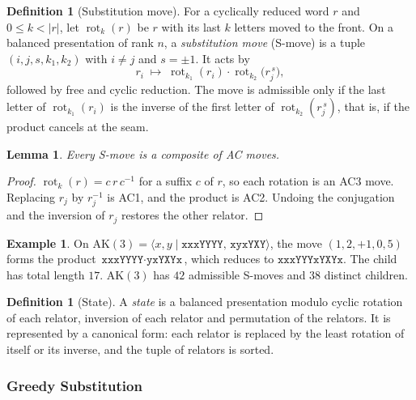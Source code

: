\documentclass[11pt]{article}
\newtheorem{lemma}[theorem]{Lemma}
\theoremstyle{definition}
\newtheorem{definition}[theorem]{Definition}
\newtheorem{example}[theorem]{Example}
\theoremstyle{remark}
\newcommand{\pres}[2]{\langle #1 \mid #2 \rangle}
\newcommand{\rot}{\operatorname{rot}}
\begin{document}
\begin{definition}[Substitution move]\label{def:smove}
For a cyclically reduced word $r$ and $0\le k<|r|$, let $\rot_k(r)$ be $r$ with its last $k$ letters moved to the
front. On a balanced presentation of rank $n$, a \emph{substitution move} (S-move) is a tuple $(i,j,s,k_1,k_2)$ with
$i\neq j$ and $s=\pm1$. It acts by
\[
r_i\;\longmapsto\;\rot_{k_1}(r_i)\cdot\rot_{k_2}\!\big(r_j^{\,s}\big),
\]
followed by free and cyclic reduction. The move is admissible only if the last letter of $\rot_{k_1}(r_i)$ is the
inverse of the first letter of $\rot_{k_2}(r_j^{\,s})$, that is, if the product cancels at the seam.
\end{definition}

\begin{lemma}
Every S-move is a composite of AC moves.
\end{lemma}

\begin{proof}
$\rot_k(r)=c\,r\,c^{-1}$ for a suffix $c$ of $r$, so each rotation is an AC3 move. Replacing $r_j$ by $r_j^{-1}$ is AC1,
and the product is AC2. Undoing the conjugation and the inversion of $r_j$ restores the other relator.
\end{proof}

\begin{example}
On $\mathrm{AK}(3)=\pres{x,y}{\texttt{xxxYYYY},\,\texttt{xyxYXY}}$, the move $(1,2,+1,0,5)$ forms the product
$\texttt{xxxYYYY}\cdot\texttt{yxYXYx}$, which reduces to $\texttt{xxxYYYxYXYx}$. The child has total length $17$.
$\mathrm{AK}(3)$ has $42$ admissible S-moves and $38$ distinct children.
\end{example}

\begin{definition}[State]
A \emph{state} is a balanced presentation modulo cyclic rotation of each relator, inversion of each relator and
permutation of the relators. It is represented by a canonical form: each relator is replaced by the least rotation of
itself or its inverse, and the tuple of relators is sorted.
\end{definition}

\subsubsection{Greedy Substitution}\label{sec:greedy}
\end{document}
